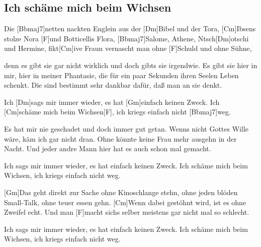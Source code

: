 \subsection*{Ich schäme mich beim Wichsen   }
\begin{guitar}

    Die [Bbmaj7]netten nackten Englein aus der [Dm]Bibel und der Tora, 
    [Cm]Ibsens stolze Nora [F]und Botticellis Flora, 
    [Bbmaj7]Salome, Athene, Ntsch[Dm]otschi und Hermine, 
    fikt[Cm]ive Fraun vernascht man ohne [F]Schuld und ohne Sühne, 


    denn es gibt sie gar nicht wirklich und doch gibts sie irgendwie. 
    Es gibt sie hier in mir, hier in meiner Phantasie, 
    die für ein paar Sekunden ihren Seelen Leben schenkt. 
    Die sind bestimmt sehr dankbar dafür, daß man an sie denkt. 


    Ich [Dm]sags mir immer wieder, 
    es hat [Gm]einfach keinen Zweck. 
    Ich [Cm]schäme mich beim Wichsen[F], 
    ich kriegs einfach nicht [Bbmaj7]weg. 


    Es hat mir nie geschadet und doch immer gut getan. 
    Wenns nicht Gottes Wille wäre, käm ich gar nicht dran. 
    Ohne könnte keine Frau mehr ausgehn in der Nacht. 
    Und jeder andre Mann hier hat es auch schon mal gemacht. 


    Ich sags mir immer wieder, 
    es hat einfach keinen Zweck. 
    Ich schäme mich beim Wichsen, 
    ich kriegs einfach nicht weg. 


    [Gm]Das geht direkt zur Sache ohne Kinoschlange stehn, 
    ohne jeden blöden Small-Talk, ohne teuer essen gehn. 
    [Cm]Wenn dabei gestöhnt wird, ist es ohne Zweifel echt. 
    Und man [F]macht sichs selber meistens gar nicht mal so schlecht.


    Ich sags mir immer wieder, 
    es hat einfach keinen Zweck. 
    Ich schäme mich beim Wichsen, 
    ich kriegs einfach nicht weg.
\end{guitar}
